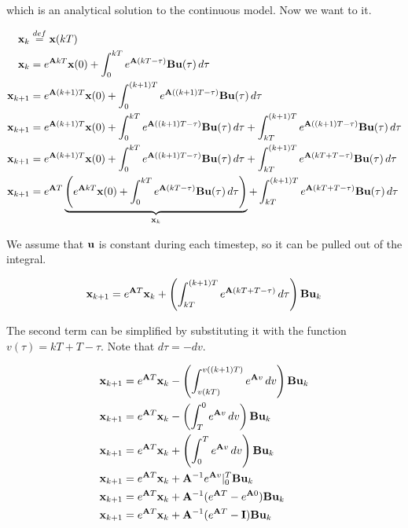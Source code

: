 which is an analytical solution to the continuous \gls{model}. Now we want to
 it.

\begin{align*}
  \mathbf{x}_k &\stackrel{def}{=} \mathbf{x}(kT) \\
  \mathbf{x}_k &= e^{\mathbf{A}kT}\mathbf{x}(0) +
    \int_0^{kT} e^{\mathbf{A}(kT - \tau)}\mathbf{B}\mathbf{u}(\tau) \,d\tau \\
  \mathbf{x}_{k+1} &= e^{\mathbf{A}(k + 1)T}\mathbf{x}(0) +
    \int_0^{(k + 1)T} e^{\mathbf{A}((k + 1)T - \tau)}\mathbf{B}\mathbf{u}(\tau) \,d\tau
    \\
  \mathbf{x}_{k+1} &= e^{\mathbf{A}(k + 1)T}\mathbf{x}(0) +
    \int_0^{kT} e^{\mathbf{A}((k + 1)T - \tau)}\mathbf{B}\mathbf{u}(\tau) \,d\tau +
    \int_{kT}^{(k + 1)T} e^{\mathbf{A}((k + 1)T - \tau)}\mathbf{B}\mathbf{u}(\tau)
    \,d\tau \\
  \mathbf{x}_{k+1} &= e^{\mathbf{A}(k + 1)T}\mathbf{x}(0) +
    \int_0^{kT} e^{\mathbf{A}((k + 1)T - \tau)}\mathbf{B}\mathbf{u}(\tau) \,d\tau +
    \int_{kT}^{(k + 1)T} e^{\mathbf{A}(kT + T - \tau)}\mathbf{B}\mathbf{u}(\tau) \,d\tau
    \\
  \mathbf{x}_{k+1} &= e^{\mathbf{A}T} \underbrace{\left(e^{\mathbf{A}kT}\mathbf{x}(0) +
    \int_0^{kT} e^{\mathbf{A}(kT - \tau)}\mathbf{B}\mathbf{u}(\tau)
    \,d\tau\right)}_{\mathbf{x}_k} +
    \int_{kT}^{(k + 1)T} e^{\mathbf{A}(kT + T - \tau)}\mathbf{B}\mathbf{u}(\tau) \,d\tau
\end{align*}

We assume that $\mathbf{u}$ is constant during each timestep, so it can be pulled
out of the integral.

\begin{equation*}
  \mathbf{x}_{k+1} = e^{\mathbf{A}T}\mathbf{x}_k +
    \left(\int_{kT}^{(k + 1)T} e^{\mathbf{A}(kT + T - \tau)} \,d\tau\right)
    \mathbf{B}\mathbf{u}_k
\end{equation*}

The second term can be simplified by substituting it with the function
$v(\tau) = kT + T - \tau$. Note that $d\tau = -dv$.

\begin{align*}
  \mathbf{x}_{k+1} &= e^{\mathbf{A}T}\mathbf{x}_k -
    \left(\int_{v(kT)}^{v((k + 1)T)} e^{\mathbf{A}v} \,dv\right)
    \mathbf{B}\mathbf{u}_k \\
  \mathbf{x}_{k+1} &= e^{\mathbf{A}T}\mathbf{x}_k -
    \left(\int_T^0 e^{\mathbf{A}v} \,dv\right) \mathbf{B}\mathbf{u}_k \\
  \mathbf{x}_{k+1} &= e^{\mathbf{A}T}\mathbf{x}_k +
    \left(\int_0^T e^{\mathbf{A}v} \,dv\right) \mathbf{B}\mathbf{u}_k \\
  \mathbf{x}_{k+1} &= e^{\mathbf{A}T}\mathbf{x}_k +
    \mathbf{A}^{-1}e^{\mathbf{A}v} \rvert_0^T \mathbf{B}\mathbf{u}_k \\
  \mathbf{x}_{k+1} &= e^{\mathbf{A}T}\mathbf{x}_k +
    \mathbf{A}^{-1}(e^{\mathbf{A}T} - e^{\mathbf{A}0}) \mathbf{B}\mathbf{u}_k \\
  \mathbf{x}_{k+1} &= e^{\mathbf{A}T}\mathbf{x}_k +
    \mathbf{A}^{-1}(e^{\mathbf{A}T} - \mathbf{I}) \mathbf{B}\mathbf{u}_k
\end{align*}

